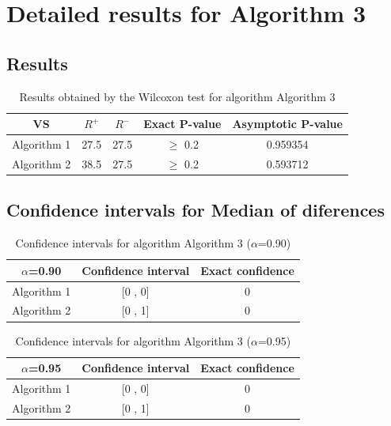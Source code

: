 \documentclass[a4paper,10pt]{article}
\begin{document}
 \clearpage 


\section{Detailed results for Algorithm 3}


\subsection{Results}

\begin{table}[!htp]
\centering\small
\begin{tabular}{
|c|c|c|c|c|}
\hline
 VS & $R^{+}$ & $R^{-}$ & Exact P-value & Asymptotic P-value \\ \hline 
Algorithm 1 & 27.5 & 27.5 & $\geq$ 0.2 & 0.959354\\ \hline 
Algorithm 2 & 38.5 & 27.5 & $\geq$ 0.2 & 0.593712\\ \hline 

\end{tabular}
\caption{Results obtained by the Wilcoxon test for algorithm Algorithm 3}
\end{table}

\subsection{Confidence intervals for Median of diferences}

\begin{table}[!htp]
\centering\small
\begin{tabular}{
|c|c|c|}
\hline
 $\alpha$=0.90 & Confidence interval & Exact confidence \\ \hline 
Algorithm 1 & [0 , 0] & 0\\ \hline 
Algorithm 2 & [0 , 1] & 0\\ \hline 

\end{tabular}
\caption{Confidence intervals for algorithm Algorithm 3 ($\alpha$=0.90)}
\end{table}
\begin{table}[!htp]
\centering\small
\begin{tabular}{
|c|c|c|}
\hline
 $\alpha$=0.95 & Confidence interval & Exact confidence \\ \hline 
Algorithm 1 & [0 , 0] & 0\\ \hline 
Algorithm 2 & [0 , 1] & 0\\ \hline 

\end{tabular}
\caption{Confidence intervals for algorithm Algorithm 3 ($\alpha$=0.95)}
\end{table}

 \clearpage 
\end{document}
